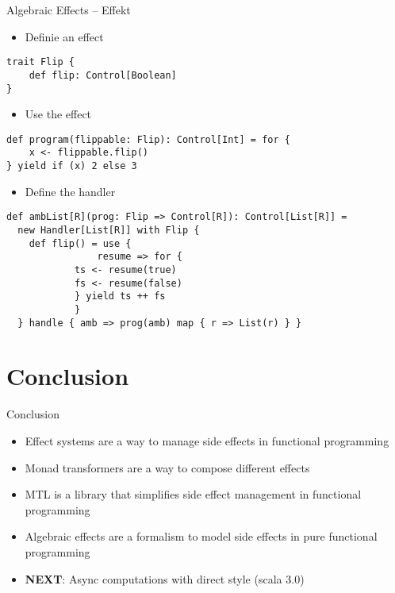 \documentclass[presentation, 10pt]{beamer}\mode<presentation>{\usetheme{AMSBolognaFC}}
\begin{document}
\begin{frame}[fragile, shrink=15]{Algebraic Effects -- Effekt}
	\begin{itemize}
		\item Definie an effect
	\end{itemize}
\begin{tcolorbox}
\begin{verbatim}
trait Flip {
	def flip: Control[Boolean]
}
\end{verbatim}
\end{tcolorbox}
\begin{itemize}
	\item Use the effect
\end{itemize}
\begin{tcolorbox}
\begin{verbatim}
def program(flippable: Flip): Control[Int] = for {
	x <- flippable.flip()
} yield if (x) 2 else 3
\end{verbatim}
\end{tcolorbox}
\begin{itemize}
	\item Define the handler
\end{itemize}
\begin{tcolorbox}
\begin{verbatim}
def ambList[R](prog: Flip => Control[R]): Control[List[R]] =
  new Handler[List[R]] with Flip {
    def flip() = use { 
				resume => for {
      		ts <- resume(true)
      		fs <- resume(false)
    		} yield ts ++ fs 
			}
  } handle { amb => prog(amb) map { r => List(r) } }
\end{verbatim}
\end{tcolorbox}
\end{frame}
\section{Conclusion}
\begin{frame}{Conclusion}
	\begin{itemize}
		\item Effect systems are a way to manage side effects in functional programming
		\item Monad transformers are a way to compose different effects
		\item MTL is a library that simplifies side effect management in functional programming
		\item Algebraic effects are a formalism to model side effects in pure functional programming
		\item \textbf{NEXT}: Async computations with direct style (scala 3.0)
	\end{itemize}
\end{frame}
\frame{\titlepage}
\end{document}
